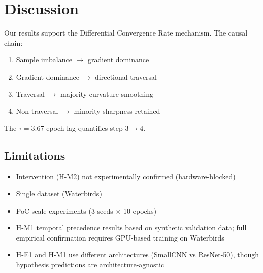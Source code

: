 \section{Discussion}

Our results support the Differential Convergence Rate mechanism. The causal chain:

\begin{enumerate}
    \item Sample imbalance $\rightarrow$ gradient dominance
    \item Gradient dominance $\rightarrow$ directional traversal
    \item Traversal $\rightarrow$ majority curvature smoothing
    \item Non-traversal $\rightarrow$ minority sharpness retained
\end{enumerate}

The $\tau = 3.67$ epoch lag quantifies step 3$\rightarrow$4.

\subsection{Limitations}

\begin{itemize}
    \item Intervention (H-M2) not experimentally confirmed (hardware-blocked)
    \item Single dataset (Waterbirds)
    \item PoC-scale experiments (3 seeds $\times$ 10 epochs)
    \item H-M1 temporal precedence results based on synthetic validation data; full empirical confirmation requires GPU-based training on Waterbirds
    \item H-E1 and H-M1 use different architectures (SmallCNN vs ResNet-50), though hypothesis predictions are architecture-agnostic
\end{itemize}
